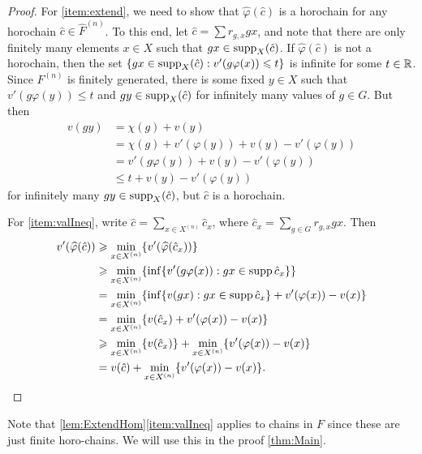 \documentclass[11pt, letterpaper]{amsart}
\begin{document}
\begin{proof}
For \ref{item:extend}, we need to show that $\widehat{\varphi}(\hat{c})$ is a horochain  for any horochain $\hat{c} \in \widehat{F}^{(n)}$. To this end, let $\hat{c} = \sum r_{g,x} gx$, and note that there are only finitely many elements $x \in X$ such that $gx \in \operatorname{supp}_X(\hat{c})$. If $\widehat{\varphi}(\hat{c})$ is not a horochain, then the set $\{ gx \in \operatorname{supp}_X(\hat{c}) : v'(g\varphi(x)) \leqslant t \}$ is infinite for some $t \in \mathbb{R}$. Since $F^{(n)}$ is finitely generated, there is some fixed $y \in X$ such that $v'(g\varphi(y)) \leqslant t$ and $gy \in \operatorname{supp}_X(\hat{c})$ for infinitely many values of $g \in G$. But then
\begin{align*}
    v(gy) &= \chi(g) + v(y) \\
        &= \chi(g) + v'(\varphi(y)) + v(y) - v'(\varphi(y))\\
        &= v'(g\varphi(y)) + v(y) - v'(\varphi(y)) \\
        &\leqslant t + v(y) - v'(\varphi(y))
\end{align*}
for infinitely many $gy \in \operatorname{supp}_X(\hat{c})$, but $\hat{c}$ is a horochain. 

For \ref{item:valIneq}, write $\hat{c} = \sum_{x\in X^{(n)}} \hat{c}_x$, where $\hat{c}_x = \sum_{g \in G} r_{g,x} g x$. Then
\begin{align*}
    v'(\widehat{\varphi}(\hat{c})) &\geqslant \min_{x \in X^{(n)}}\{ v'(\widehat{\varphi}(\hat{c}_x))\} \\
    &\geqslant \min_{x \in X^{(n)}} \{ \inf\{ v'(g\varphi(x)) : gx \in \operatorname{supp} \hat{c}_x \}   \} \\
    &= \min_{x \in X^{(n)}}\{ \inf\{ v(gx) : gx \in \operatorname{supp} \hat{c}_x \} + v'(\varphi(x)) - v(x)  \} \\
    &= \min_{x \in X^{(n)}} \{ v(\hat{c}_x) + v'(\varphi(x)) - v(x)  \} \\
    &\geqslant \min_{x \in X^{(n)}} \{ v(\hat{c}_x) \} +  \min_{x \in X^{(n)}}\{ v'(\varphi(x)) - v(x) \} \\
    &= v(\hat{c}) + \min_{x \in X^{(n)}} \{ v'(\varphi(x)) - v(x) \}. \qedhere
\end{align*}  \qedhere
\end{proof}

Note that \cref{lem:ExtendHom}\ref{item:valIneq} applies to chains in $F$ since these are just finite horo-chains. We will use this in the proof \cref{thm:Main}.
\end{document}
